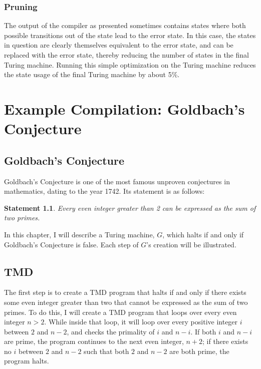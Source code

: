 \documentclass[11pt]{report}
\newtheorem{statement}{Statement}
\begin{document}
\subsection{Pruning}

The output of the compiler as presented sometimes contains states where both possible transitions out of the state lead to the error state. In this case, the states in question are clearly themselves equivalent to the error state, and can be replaced with the error state, thereby reducing the number of states in the final Turing machine. Running this simple optimization on the Turing machine reduces the state usage of the final Turing machine by about 5\%.



\chapter{Example Compilation: Goldbach's Conjecture}

\section{Goldbach's Conjecture}

Goldbach's Conjecture is one of the most famous unproven conjectures in mathematics, dating to the year 1742. Its statement is as follows: \\

\begin{statement}
\emph{Every even integer greater than 2 can be expressed as the sum of two primes.}
\label{goldbachstatement}
\end{statement}

In this chapter, I will describe a Turing machine, $G$, which halts if and only if Goldbach's Conjecture is false. Each step of $G$'s creation will be illustrated.

\section{TMD \label{sec:tmdgoldbach}}

The first step is to create a TMD program that halts if and only if there exists some even integer greater than two that cannot be expressed as the sum of two primes. To do this, I will create a TMD program that loops over every even integer $n > 2$. While inside that loop, it will loop over every positive integer $i$ between $2$ and $n-2$, and checks the primality of $i$ and $n-i$. If both $i$ and $n-i$ are prime, the program continues to the next even integer, $n+2$; if there exists no $i$ between $2$ and $n-2$ such that both $2$ and $n-2$ are both prime, the program halts. %
\end{document}
